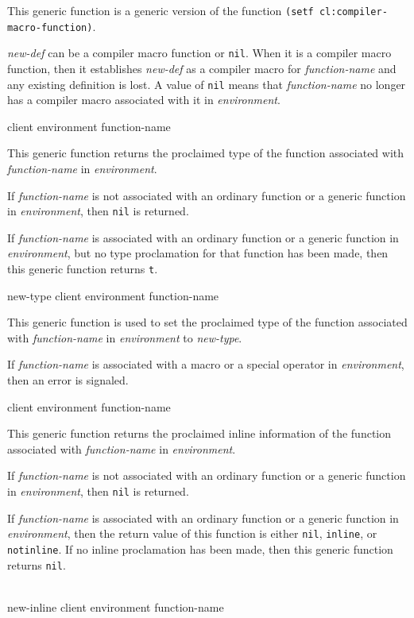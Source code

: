 This generic function is a generic version of the \commonlisp{}
function \texttt{(setf cl:compiler-macro-function)}.

\textit{new-def} can be a compiler macro function or \texttt{nil}.
When it is a compiler macro function, then it establishes
\textit{new-def} as a compiler macro for \textit{function-name} and
any existing definition is lost.  A value of \texttt{nil} means that
\textit{function-name} no longer has a compiler macro associated with
it in \textit{environment}.

 {client environment function-name}

This generic function returns the proclaimed type of the function
associated with \textit{function-name} in \textit{environment}.

If \textit{function-name} is not associated with an ordinary function
or a generic function in \textit{environment}, then \texttt{nil} is
returned.

If \textit{function-name} is associated with an ordinary function or a
generic function in \textit{environment}, but no type proclamation for
that function has been made, then this generic function returns
\texttt{t}.

 {new-type client environment function-name}

This generic function is used to set the proclaimed type of the
function associated with \textit{function-name} in
\textit{environment} to \textit{new-type}.

If \textit{function-name} is associated with a macro or a special
operator in \textit{environment}, then an error is signaled.

 {client environment function-name}

This generic function returns the proclaimed inline information of the
function associated with \textit{function-name} in
\textit{environment}.

If \textit{function-name} is not associated with an ordinary function
or a generic function in \textit{environment}, then \texttt{nil} is
returned.

If \textit{function-name} is associated with an ordinary function or a
generic function in \textit{environment}, then the return value of
this function is either \texttt{nil}, \texttt{inline}, or
\texttt{notinline}.  If no inline proclamation has been made, then
this generic function returns \texttt{nil}.

\\
{new-inline client environment function-name}

